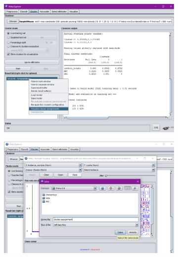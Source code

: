 \documentclass[12pt]{article}
\begin{document}
\begin{figure}
	\centering 
	\begin{subfigure}[b]{0.496\textwidth} 
	\includegraphics[width=\textwidth]{img/save-cluster-ass-1.pdf}
	\end{subfigure}
	\begin{subfigure}[b]{0.496\textwidth}
	\includegraphics[width=\textwidth]{img/save-cluster-ass-2.pdf}
	\end{subfigure}


\end{figure}
\end{document}

